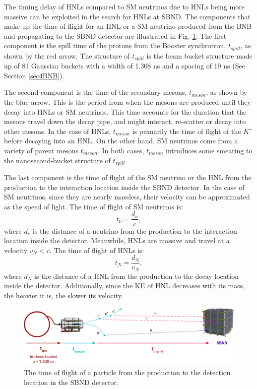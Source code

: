 The timing delay of HNLs compared to SM neutrinos due to HNLs being more massive can be exploited in the search for HNLs at SBND. 
The components that make up the time of flight for an HNL or a SM neutrino produced from the BNB and propagating to the SBND detector are illustrated in Fig. \ref{fig:tof_beam_to_detector}.
The first component is the spill time of the protons from the Booster synchrotron, $t_{spill}$, as shown by the red arrow.
The structure of $t_{spill}$ is the beam bucket structure made up of 81 Gaussian buckets with a width of 1.308 ns and a spacing of 19 ns (See Section \ref{sec4BNB}).   

The second component is the time of the secondary mesons, $t_{meson}$, as shown by the blue arrow.
This is the period from when the mesons are produced until they decay into HNLs or SM neutrinos.
This time accounts for the duration that the mesons travel down the decay pipe, and might interact, re-scatter or decay into other mesons.
In the case of HNLs, $t_{meson}$ is primarily the time of flight of the $K^+$ before decaying into an HNL.
On the other hand, SM neutrinos come from a variety of parent mesons $t_{meson}$. %
In both cases, $t_{meson}$ introduces some smearing to the nanosecond-bucket structure of $t_{spill}$.

The last component is the time of flight of the SM neutrino or the HNL from the production to the interaction location inside the SBND detector.
In the case of SM neutrinos, since they are nearly massless, their velocity can be approximated as the speed of light. 
The time of flight of SM neutrinos is:  
\begin{equation}
	t_{\nu} = \frac{d_{\nu}}{c},
\end{equation}
where $d_{\nu}$ is the distance of a neutrino from the production to the interaction location inside the detector.
Meanwhile, HNLs are massive and travel at a velocity $v_N < c$.
The time of flight of HNLs is:
\begin{equation}
	t_{N} = \frac{d_{N}}{v_N},
\end{equation}
where $d_N$ is the distance of a HNL from the production to the decay location inside the detector.
Additionally, since the KE of HNL decreases with its mass, the heavier it is, the slower its velocity.

\begin{figure}[hb!] 
\vspace{0.5cm}
\centering    
\includegraphics[width=1.0\textwidth]{tof_beam_to_detector}
\caption[Time of Flight of Particles from the BNB to SBND Diagram]{
The time of flight of a particle from the production to the detection location in the SBND detector.
}
\label{fig:tof_beam_to_detector}
\end{figure}

